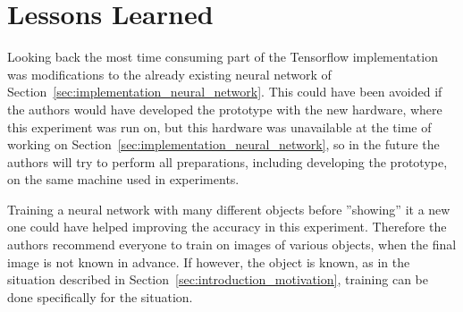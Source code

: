 \section{Lessons Learned}
Looking back the most time consuming part of the Tensorflow implementation was modifications to the already existing neural network of Section~\ref{sec:implementation_neural_network}. This could have been avoided if the authors would have developed the prototype with the new hardware, where this experiment was run on, but this hardware was unavailable at the time of working on Section~\ref{sec:implementation_neural_network}, so in the future the authors will try to perform all preparations, including developing the prototype, on the same machine used in experiments.

Training a neural network with many different objects before ''showing'' it a new one could have helped improving the accuracy in this experiment. Therefore the authors recommend everyone to train on images of various objects, when the final image is not known in advance. If however, the object is known, as in the situation described in Section~\ref{sec:introduction_motivation}, training can be done specifically for the situation.

\filbreak
